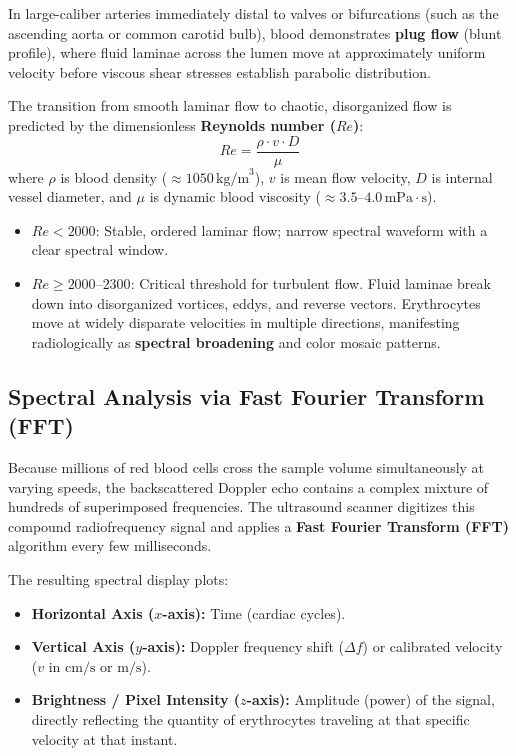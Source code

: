 \documentclass[11pt,a4paper]{article}
\begin{document}
In large-caliber arteries immediately distal to valves or bifurcations (such as the ascending aorta or common carotid bulb), blood demonstrates \textbf{plug flow} (blunt profile), where fluid laminae across the lumen move at approximately uniform velocity before viscous shear stresses establish parabolic distribution.

\begin{hemodynamics}
The transition from smooth laminar flow to chaotic, disorganized flow is predicted by the dimensionless \textbf{Reynolds number ($Re$)}:
\begin{equation}
    Re = \frac{\rho \cdot v \cdot D}{\mu}
\end{equation}
where $\rho$ is blood density ($\approx 1050\,\text{kg/m}^3$), $v$ is mean flow velocity, $D$ is internal vessel diameter, and $\mu$ is dynamic blood viscosity ($\approx 3.5\text{--}4.0\,\text{mPa}\cdot\text{s}$).
\begin{itemize}[leftmargin=*]
    \item $Re < 2000$: Stable, ordered laminar flow; narrow spectral waveform with a clear spectral window.
    \item $Re \ge 2000\text{--}2300$: Critical threshold for turbulent flow. Fluid laminae break down into disorganized vortices, eddys, and reverse vectors. Erythrocytes move at widely disparate velocities in multiple directions, manifesting radiologically as \textbf{spectral broadening} and color mosaic patterns.
\end{itemize}
\end{hemodynamics}

\subsection{Spectral Analysis via Fast Fourier Transform (FFT)}

Because millions of red blood cells cross the sample volume simultaneously at varying speeds, the backscattered Doppler echo contains a complex mixture of hundreds of superimposed frequencies. The ultrasound scanner digitizes this compound radiofrequency signal and applies a \textbf{Fast Fourier Transform (FFT)} algorithm every few milliseconds.

The resulting spectral display plots:
\begin{itemize}[leftmargin=*]
    \item \textbf{Horizontal Axis ($x$-axis):} Time (cardiac cycles).
    \item \textbf{Vertical Axis ($y$-axis):} Doppler frequency shift ($\Delta f$) or calibrated velocity ($v$ in $\text{cm/s}$ or $\text{m/s}$).
    \item \textbf{Brightness / Pixel Intensity ($z$-axis):} Amplitude (power) of the signal, directly reflecting the quantity of erythrocytes traveling at that specific velocity at that instant.
\end{itemize}
\end{document}
